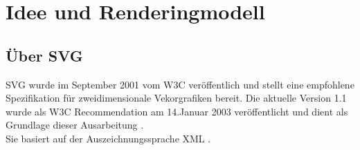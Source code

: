 \section{Idee und Renderingmodell}
\subsection{Über SVG}
SVG wurde im September 2001 vom W3C veröffentlich und stellt eine empfohlene Spezifikation für zweidimensionale Vekorgrafiken bereit. Die aktuelle Version 1.1 wurde als W3C Recommendation am 14.Januar 2003 veröffentlicht und dient als Grundlage dieser Ausarbeitung \cite{svg:2003}.\\
Sie basiert auf der Auszeichnungssprache XML \cite{xml:2008}.
